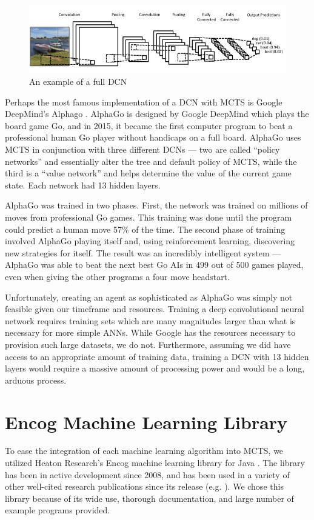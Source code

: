 \begin{figure}[h]
\centering
\includegraphics[scale=0.5]{images/cnnfull.png}
\caption{An example of a full DCN \cite{clarifai}}
\label{ref:cnnfull}
\end{figure}

Perhaps the most famous implementation of a DCN with MCTS is Google DeepMind's Alphago \cite{alphago}.  AlphaGo is designed by Google DeepMind which plays the board game Go, and in 2015, it became the first computer program to beat a professional human Go player without handicaps on a full board.  AlphaGo uses MCTS in conjunction with three different DCNs --- two are called ``policy networks'' and essentially alter the tree and default policy of MCTS, while the third is a ``value network'' and helps determine the value of the current game state.  Each network had 13 hidden layers.

AlphaGo was trained in two phases. First, the network was trained on millions of moves from professional Go games. This training was done until the program could predict a human move 57\% of the time. The second phase of training involved AlphaGo playing itself and, using reinforcement learning, discovering new strategies for itself. The result was an incredibly intelligent system --- AlphaGo was able to beat the next best Go AIs in 499 out of 500 games played, even when giving the other programs a four move headstart.\cite{alphago}

Unfortunately, creating an agent as sophisticated as AlphaGo was simply not feasible given our timeframe and resources.  Training a deep convolutional neural network requires training sets which are many magnitudes larger than what is necessary for more simple ANNs.  While Google has the resources necessary to provision such large datasets, we do not.  Furthermore, assuming we did have access to an appropriate amount of training data, training a DCN with 13 hidden layers would require a massive amount of processing power and would be a long, arduous process.

\section{Encog Machine Learning Library}
To ease the integration of each machine learning algorithm into MCTS, we utilized Heaton Research's Encog machine learning library for Java \cite{encog}.  The library has been in active development since 2008, and has been used in a variety of other well-cited research publications since its release (e.g. \cite{encogref1, encogref2, encogref3}).  We chose this library because of its wide use, thorough documentation, and large number of example programs provided.

